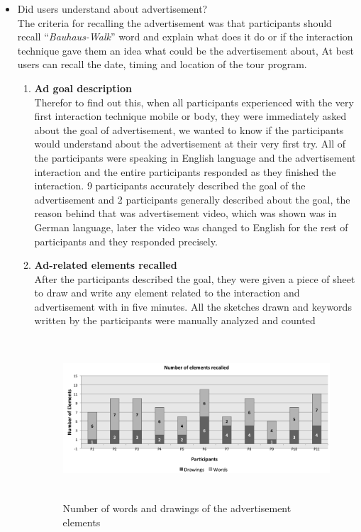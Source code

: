 \begin{itemize}


\item Did users understand about advertisement? \\

	The criteria for recalling the advertisement was that participants should recall ``\emph{Bauhaus-Walk}'' word and explain what does it do or if the interaction technique gave them an idea what could be the advertisement about, At best users can recall the date, timing and location of the tour program.

\begin{enumerate}

\item	\textbf{Ad goal description} \\
Therefor to find out this, when all participants experienced with the very first interaction technique mobile or body, they were immediately asked about the goal of advertisement, we wanted to know if the participants would understand about the advertisement at their very first try. All of the participants were speaking in English language and the advertisement interaction and the entire participants responded as they finished the interaction. 9 participants accurately described the goal of the advertisement and 2 participants generally described about the goal, the reason behind that was advertisement video, which was shown was in German language, later the video was changed to English for the rest of participants and they responded precisely.



\item	\textbf{Ad-related elements recalled}  \\ 
After the participants described the goal, they were given a piece of sheet to draw and write any element related to the interaction and advertisement with in five minutes. All the sketches drawn and keywords written by the participants were manually analyzed and counted

\begin{figure}[H]
\centering
\includegraphics[width=12cm,height=6cm]{Figures/6/word_recall}%
 \caption{Number of words and drawings of the advertisement elements }%
 \label{fig:word_recall}%
\end{figure}


\end{enumerate}
\end{itemize}

